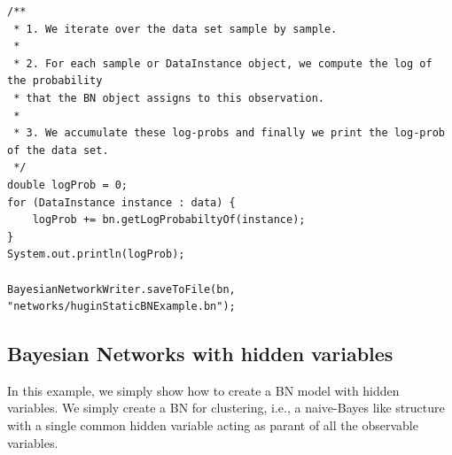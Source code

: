 \begin{lstlisting}
/**
 * 1. We iterate over the data set sample by sample.
 *
 * 2. For each sample or DataInstance object, we compute the log of the probability 
 * that the BN object assigns to this observation.
 *
 * 3. We accumulate these log-probs and finally we print the log-prob of the data set.
 */
double logProb = 0;
for (DataInstance instance : data) {
    logProb += bn.getLogProbabiltyOf(instance);
}
System.out.println(logProb);

BayesianNetworkWriter.saveToFile(bn, "networks/huginStaticBNExample.bn");
\end{lstlisting}


\subsection{Bayesian Networks with hidden variables}

In this example, we simply show how to create a BN model with hidden variables. We simply create a BN for clustering, i.e.,  a naive-Bayes like structure with a single common hidden variable acting as parant of all the observable variables.
 

